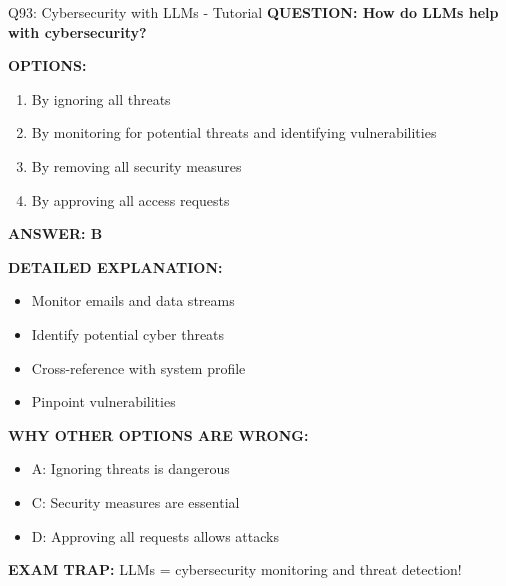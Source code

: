 \documentclass[8pt]{beamer}
\begin{document}
	\begin{frame}{Q93: Cybersecurity with LLMs - Tutorial}
		\fontsize{6.5}{7.5}\selectfont
		\textbf{QUESTION: How do LLMs help with cybersecurity?}
		
		\vspace{0.1cm}
		\textbf{OPTIONS:}
		\begin{enumerate}
			\item By ignoring all threats
			\item By monitoring for potential threats and identifying vulnerabilities
			\item By removing all security measures
			\item By approving all access requests
		\end{enumerate}
		
		\vspace{0.1cm}
		\textcolor{myblue}{\textbf{ANSWER: B}}
		
		\vspace{0.1cm}
		\textbf{DETAILED EXPLANATION:}
		\begin{itemize}
			\item Monitor emails and data streams
			\item Identify potential cyber threats
			\item Cross-reference with system profile
			\item Pinpoint vulnerabilities
		\end{itemize}
		
		\vspace{0.1cm}
		\textcolor{myred}{\textbf{WHY OTHER OPTIONS ARE WRONG:}}
		\begin{itemize}
			\item \textcolor{myred}{A:} Ignoring threats is dangerous
			\item \textcolor{myred}{C:} Security measures are essential
			\item \textcolor{myred}{D:} Approving all requests allows attacks
		\end{itemize}
		
		\textcolor{myred}{\textbf{EXAM TRAP:}} LLMs = \textcolor{myblue}{cybersecurity monitoring and threat detection}!
	\end{frame}
	
\end{document}
